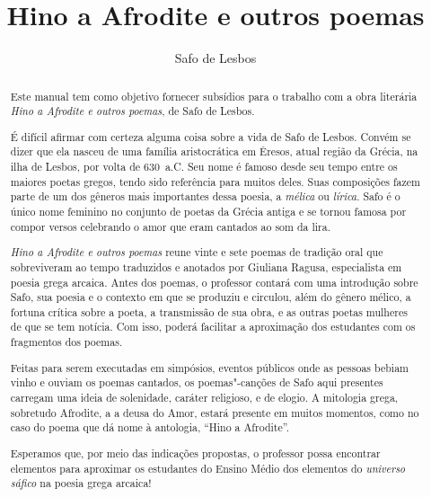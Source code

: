 \documentclass[12pt]{extarticle}
\begin{document}
\newcommand{\AutorLivro}{Safo de Lesbos}
\newcommand{\TituloLivro}{Hino a Afrodite e outros poemas}
\newcommand{\Tema}{Ficção, mistério e fantasia}
\newcommand{\Genero}{Poema}
\newcommand{\imagemCapa}{./images/PNLD0035-01.png}
\newcommand{\issnppub}{978-65-994439-1-6}
\newcommand{\issnepub}{978-65-994439-2-3}
\newcommand{\colaborador}{{Vicente Castro e Bruno Gradella}}


\title{\TituloLivro}
\author{\AutorLivro}
\def\authornotes{\colaborador}

\date{}
\maketitle

\baselineskip\par


\begin{abstract}
Este manual tem como objetivo fornecer subsídios para o trabalho com a
obra literária \emph{Hino a Afrodite e outros poemas}, de Safo de Lesbos.

É difícil afirmar com certeza alguma coisa sobre a vida de Safo de Lesbos.
Convém se dizer que ela nasceu de uma família aristocrática em Êresos, atual região da
Grécia, na ilha de Lesbos, por volta de 630~a.C. Seu nome é famoso desde seu tempo entre 
os maiores poetas gregos, tendo sido referência para muitos deles. Suas composições fazem
parte de um dos gêneros mais importantes dessa poesia, a \textit{mélica} ou \textit{lírica}.
Safo é o único nome feminino no conjunto de poetas da Grécia antiga e se tornou famosa por 
compor versos celebrando o amor que eram cantados ao som da lira.

\emph{Hino a Afrodite e outros poemas} reune vinte e sete poemas de tradição oral
que sobreviveram ao tempo traduzidos e anotados por Giuliana Ragusa, especialista em 
poesia grega arcaica. Antes dos poemas, o professor contará com uma introdução sobre Safo, 
sua poesia e o contexto em que se produziu e circulou, além do gênero mélico, a fortuna 
crítica sobre a poeta, a transmissão de sua obra, e as outras poetas mulheres de que se 
tem notícia. Com isso, poderá facilitar a aproximação dos estudantes com os fragmentos 
dos poemas.

Feitas para serem executadas em simpósios, eventos públicos onde as pessoas bebiam vinho
e ouviam os poemas cantados, os poemas"-canções de Safo aqui presentes carregam uma ideia 
de solenidade, caráter religioso, e de elogio. A mitologia grega, sobretudo Afrodite, a 
a deusa do Amor, estará presente em muitos momentos, como no caso do poema que dá nome 
à antologia, ``Hino a Afrodite''. 

Esperamos que, por meio das indicações propostas, o professor possa encontrar elementos 
para aproximar os estudantes do Ensino Médio dos elementos do 
\emph{universo sáfico} na poesia grega arcaica!

\end{abstract}
\end{document}
